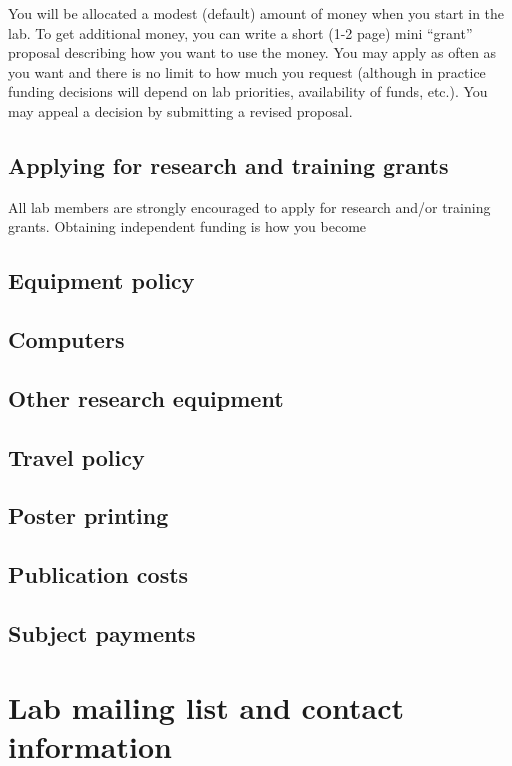 \documentclass{tufte-book} %
\begin{document}
You will be allocated a modest (default) amount of money when you start
in the lab.  To get additional money, you can write a short (1-2 page)
mini ``grant'' proposal describing how you want to use the money.  You
may apply as often as you want and there is no limit to how much you
request (although in practice funding decisions will depend on lab
priorities, availability of funds, etc.).  You may appeal a decision by
submitting a revised proposal.

 \subsection{Applying for research and training grants}
All lab members are strongly encouraged to apply for research and/or
training grants.  Obtaining independent funding is how you become 

 \subsection{Equipment policy}
 \subsection{Computers}
 \subsection{Other research equipment}

 \subsection{Travel policy}

 \subsection{Poster printing}

 \subsection{Publication costs}

 \subsection{Subject payments}





 \section{Lab mailing list and contact information}
\end{document}
